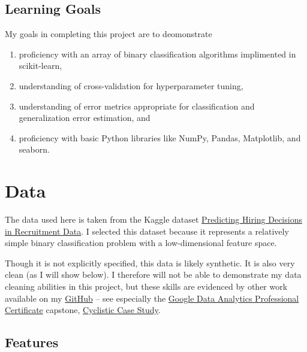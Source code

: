 \documentclass[12pt]{article}
\begin{document}
\subsection{Learning Goals}

My goals in completing this project are to deomonstrate
\begin{enumerate}
\item proficiency with an array of binary classification algorithms implimented in scikit-learn,
\item understanding of cross-validation for hyperparameter tuning,
\item understanding of error metrics appropriate for classification and generalization error estimation, and
\item proficiency with basic Python libraries like NumPy, Pandas, Matplotlib, and seaborn.
\end{enumerate}

\section{Data}

The data used here is taken from the Kaggle dataset \href{https://www.kaggle.com/datasets/rabieelkharoua/predicting-hiring-decisions-in-recruitment-data/data}{Predicting Hiring Decisions in Recruitment Data}. I selected this dataset because it represents a relatively simple binary classification problem with a low-dimensional feature space.

Though it is not explicitly specified, this data is likely synthetic. It is also very clean (as I will show below). I therefore will not be able to demonstrate my data cleaning abilities in this project, but these skills are evidenced by other work available on my \href{https://github.com/arpogg24}{GitHub} -- see especially the \href{https://www.coursera.org/professional-certificates/google-data-analytics}{Google Data Analytics Professional Certificate} capstone, \href{https://github.com/arpogg24/arpogg24.github.io/blob/main/analytics/Google_Data_Analytics-Cyclistic_Case_Study/cyclistic_case_study.pdf}{Cyclistic Case Study}.

\subsection{Features}
\end{document}
